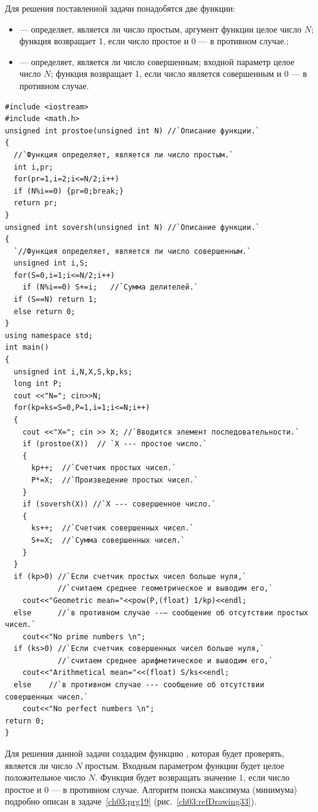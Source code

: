 Для решения поставленной задачи понадобятся две функции: 
\begin{itemize}
\item {} --- определяет, является ли число простым, аргумент функции целое число
$N$; функция возвращает 1, если число простое и 0 --- в противном
случае.;

\item {} --- определяет, является ли число совершенным; входной параметр целое число
$N$; функция возвращает 1, если число является совершенным и 0 --- в
противном случае.
\end{itemize}
\begin{lstlisting}
#include <iostream>
#include <math.h>
unsigned int prostoe(unsigned int N) //`Описание функции.`
{
  //`Функция определяет, является ли число простым.`
  int i,pr;
  for(pr=1,i=2;i<=N/2;i++)
  if (N%i==0) {pr=0;break;}
  return pr;
}
unsigned int soversh(unsigned int N) //`Описание функции.`
{
  `//Функция определяет, является ли число совершенным.`
  unsigned int i,S;
  for(S=0,i=1;i<=N/2;i++)
    if (N%i==0) S+=i; 	//`Сумма делителей.`
  if (S==N) return 1;
  else return 0;
}
using namespace std;
int main()
{
  unsigned int i,N,X,S,kp,ks;
  long int P;
  cout <<"N="; cin>>N;
  for(kp=ks=S=0,P=1,i=1;i<=N;i++)
  {
    cout <<"X="; cin >> X; //`Вводится элемент последовательности.`
    if (prostoe(X))  // `X --- простое число.`		
    {
      kp++;  //`Счетчик простых чисел.`
      P*=X;  //`Произведение простых чисел.`
    }
    if (soversh(X)) //`X --- совершенное число.`
    {
      ks++;  //`Счетчик совершенных чисел.`
      S+=X;  //`Сумма совершенных чисел.`
    }
  }
  if (kp>0) //`Если счетчик простых чисел больше нуля,`
            //`считаем среднее геометрическое и выводим его,`
    cout<<"Geometric mean="<<pow(P,(float) 1/kp)<<endl;
  else      //`в противном случае --– сообщение об отсутствии простых чисел.`
    cout<<"No prime numbers \n";
  if (ks>0) //`Если счетчик совершенных чисел больше нуля,` 
            //`считаем среднее арифметическое и выводим его,`
    cout<<"Arithmetical mean="<<(float) S/ks<<endl;
  else    //`в противном случае --- сообщение об отсутствии совершенных чисел.`
    cout<<"No perfect numbers \n";
return 0;
}
\end{lstlisting}


Для решения данной задачи создадим функцию , которая будет проверять, является ли число
$N$ простым. Входным параметром функции будет целое положительное число $N$. Функция
будет возвращать значение $1$, если число простое и $0$ --- в противном случае.
Алгоритм поиска максимума (минимума) подробно описан в задаче~\ref{ch03:prg19} (рис.~\ref{ch03:refDrawing33}).

